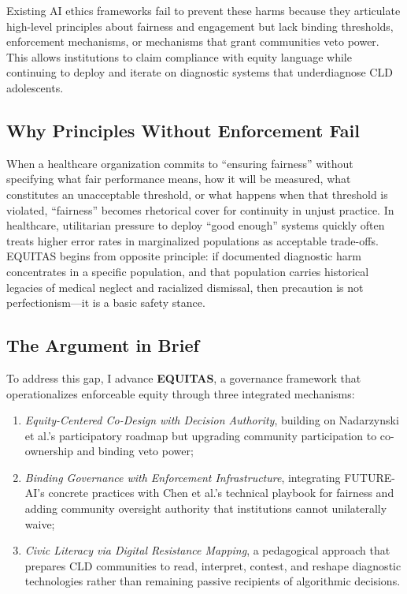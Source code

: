 \documentclass[12pt,a4paper]{article}
\begin{document}
Existing AI ethics frameworks fail to prevent these harms because they articulate high-level principles about fairness and engagement but lack binding thresholds, enforcement mechanisms, or mechanisms that grant communities veto power. This allows institutions to claim compliance with equity language while continuing to deploy and iterate on diagnostic systems that underdiagnose CLD adolescents.

\subsection{Why Principles Without Enforcement Fail}

When a healthcare organization commits to ``ensuring fairness'' without specifying what fair performance means, how it will be measured, what constitutes an unacceptable threshold, or what happens when that threshold is violated, ``fairness'' becomes rhetorical cover for continuity in unjust practice. In healthcare, utilitarian pressure to deploy ``good enough'' systems quickly often treats higher error rates in marginalized populations as acceptable trade-offs. EQUITAS begins from opposite principle: if documented diagnostic harm concentrates in a specific population, and that population carries historical legacies of medical neglect and racialized dismissal, then precaution is not perfectionism—it is a basic safety stance.\cite{garcia_ed415}

\subsection{The Argument in Brief}

To address this gap, I advance \textbf{EQUITAS}, a governance framework that operationalizes enforceable equity through three integrated mechanisms:

\begin{enumerate}
    \setlength\itemsep{0.1em}
    \item \textit{Equity-Centered Co-Design with Decision Authority}, building on Nadarzynski et al.'s participatory roadmap but upgrading community participation to co-ownership and binding veto power;\cite{nadarzynski2024}
    
    \item \textit{Binding Governance with Enforcement Infrastructure}, integrating FUTURE-AI's concrete practices \cite{lekadir2025} with Chen et al.'s technical playbook for fairness \cite{chen2023} and adding community oversight authority that institutions cannot unilaterally waive;
    
    \item \textit{Civic Literacy via Digital Resistance Mapping}, a pedagogical approach that prepares CLD communities to read, interpret, contest, and reshape diagnostic technologies rather than remaining passive recipients of algorithmic decisions.
\end{enumerate}
\end{document}
